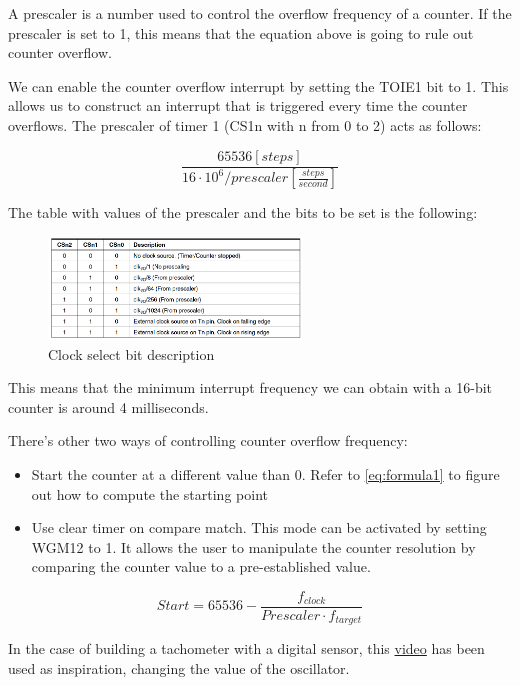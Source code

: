 \documentclass[a4paper]{article}
\begin{document}
A prescaler is a number used to control the overflow frequency of a  counter. If the prescaler is set to 1, this means that the equation above is going to rule out counter overflow.

We can enable the counter overflow interrupt by setting the TOIE1 bit to 1. This allows us to construct an interrupt that is triggered every time the counter overflows. The prescaler of timer 1 (CS1n with n from 0 to 2) acts as follows:

\begin{equation}
	\frac{65536 [steps]}{16\cdot10^{6}/prescaler[\frac{steps}{second}]}
\end{equation}

The table with values of the prescaler and the bits to be set is the following:

\begin{figure}[h!]
	\centering
	\includegraphics[width = 0.6\textwidth]{CSn.png}
	\caption{Clock select bit description}
	\label{fig:CSn}
\end{figure}

This means that the minimum interrupt frequency we can obtain with a 16-bit counter is around 4 milliseconds. 


There's other two ways of controlling counter overflow frequency:

\begin{itemize}
	\item Start the counter at a different value than 0. Refer to \autoref{eq:formula1} to figure out how to compute the starting point
	\item Use clear timer on compare match. This mode can be activated by setting WGM12 to 1. It allows the user to manipulate the counter resolution by comparing the counter value to a pre-established value.
\end{itemize}


\begin{equation}
	Start = 65536 - \frac{f_{clock}}{Prescaler\cdot f_{target}}
	\label{eq:formula1}
\end{equation}


In the case of building a tachometer with a digital sensor, this \hyperref{https://www.youtube.com/watch?v=6QZMt4yyylU}{category}{name}{video} has been used as inspiration, changing the value of the oscillator.
\end{document}
